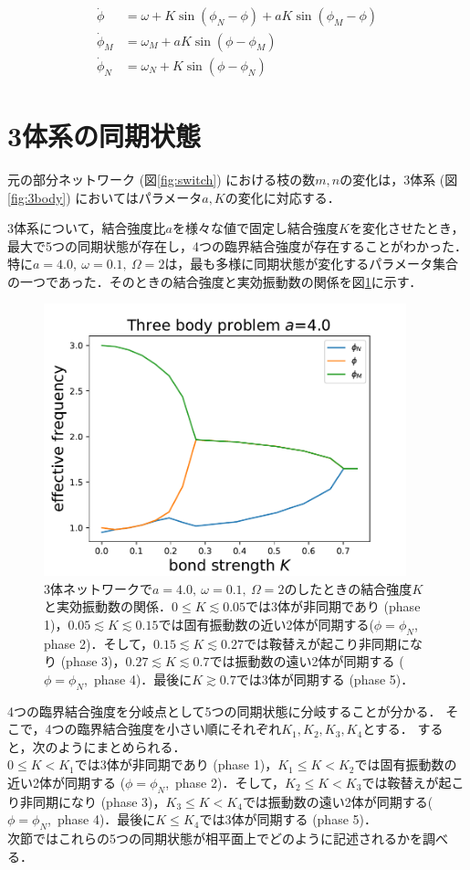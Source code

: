 \documentclass[../main]{subfiles}
\begin{document}
\begin{align}
    \label{eq:3body}
    \begin{split}
        \dot{\phi}&=\omega+K\sin\left( \phi_N-\phi \right)+aK\sin\left( \phi_M-\phi \right)\\
        \dot{\phi}_M&=\omega_M+aK\sin\left( \phi-\phi_M \right) \\
        \dot{\phi}_N&=\omega_N+K\sin\left( \phi-\phi_N \right)    
    \end{split}
\end{align}
\section{3体系の同期状態}
元の部分ネットワーク (図\ref{fig:switch}) における枝の数$m,n$の変化は，3体系 (図\ref{fig:3body}) においてはパラメータ$a,K$の変化に対応する．

3体系について，結合強度比$a$を様々な値で固定し結合強度$K$を変化させたとき，最大で5つの同期状態が存在し，4つの臨界結合強度が存在することがわかった．
特に$a=4.0,\ \omega=0.1,\ \Omega=2$は，最も多様に同期状態が変化するパラメータ集合の一つであった．そのときの結合強度と実効振動数の関係を図\ref{fig:3body-state}に示す．
\begin{figure}[t]
\centering
\includegraphics[width=105mm]{./images/three-body-prob.pdf}
\centering
\caption{3体ネットワークで$a=4.0,\ \omega=0.1,\ \Omega=2$のしたときの結合強度$K$と実効振動数の関係．$0\leq K\lesssim 0.05$では3体が非同期であり (phase 1)，$0.05\lesssim K\lesssim 0.15$では固有振動数の近い2体が同期する($\phi=\phi_N$, phase 2)．そして，$0.15 \lesssim K\lesssim 0.27$では鞍替えが起こり非同期になり (phase 3)，$0.27\lesssim K\lesssim 0.7$では振動数の遠い2体が同期する ($\phi=\phi_N$,\ phase 4)．最後に$K\gtrsim 0.7$では3体が同期する (phase 5)．}
\label{fig:3body-state}
\end{figure}
4つの臨界結合強度を分岐点として5つの同期状態に分岐することが分かる．
そこで，4つの臨界結合強度を小さい順にそれぞれ$K_1,K_2,K_3,K_4$とする．
すると，次のようにまとめられる．\\
$0\leq K<K_1$では3体が非同期であり (phase 1)，$K_1\leq K<K_2$では固有振動数の近い2体が同期する ($\phi=\phi_N$,\ phase 2)．そして，$K_2\leq K<K_3$では鞍替えが起こり非同期になり (phase 3)，$K_3\leq K<K_4$では振動数の遠い2体が同期する($\phi=\phi_N$,\ phase 4)．最後に$K\leq K_4$では3体が同期する (phase 5)．\\
次節ではこれらの5つの同期状態が相平面上でどのように記述されるかを調べる．
\end{document}
